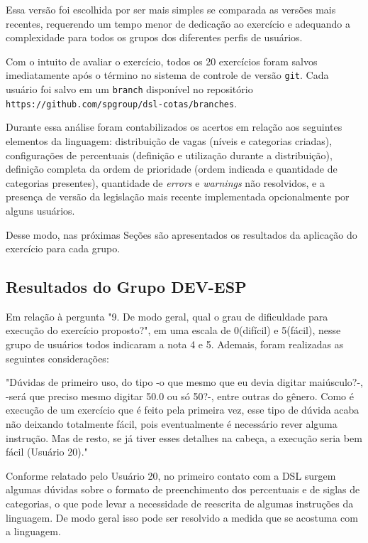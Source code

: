 Essa versão foi escolhida por ser mais simples se comparada as versões mais recentes, requerendo um tempo menor de dedicação ao exercício e adequando a complexidade para todos os grupos dos diferentes perfis de usuários. 


Com o intuito de avaliar o exercício, todos os 20 exercícios foram salvos imediatamente após o término no sistema de controle de versão \texttt{git}. Cada usuário foi salvo em um \texttt{branch} disponível no repositório \texttt{https://github.com/spgroup/dsl-cotas/branches}.


Durante essa análise foram contabilizados os acertos em relação aos seguintes elementos da linguagem: distribuição de vagas (níveis e categorias criadas), configurações de percentuais (definição e utilização durante a distribuição), definição completa da ordem de prioridade (ordem indicada e quantidade de categorias presentes), quantidade de \textit{errors} e \textit{warnings} não resolvidos, e a presença de versão da legislação mais recente implementada opcionalmente por alguns usuários.

Desse modo, nas próximas Seções são apresentados os resultados da aplicação do exercício para cada grupo.

\newpage
\subsection{Resultados do Grupo DEV-ESP}
\label{subsec:devesp}

Em relação à pergunta "9. De modo geral, qual o grau de dificuldade para execução do exercício proposto?", em uma escala de 0(difícil) e 5(fácil), nesse grupo de usuários todos indicaram a nota 4 e 5. Ademais, foram realizadas as seguintes considerações:

 \begin{citacao}
 "Dúvidas de primeiro uso, do tipo -o que  mesmo que eu devia digitar maiúsculo?-, -será que preciso mesmo digitar 50.0 ou só 50?-,  entre outras do gênero. Como é execução de um exercício que é feito pela primeira vez, esse tipo de dúvida acaba não deixando totalmente fácil, pois eventualmente é necessário rever alguma instrução. Mas de resto, se já tiver esses detalhes na cabeça, a execução seria bem fácil (Usuário 20)."
\end{citacao}

Conforme relatado pelo Usuário 20, no primeiro contato com a DSL surgem algumas dúvidas sobre o formato de preenchimento dos percentuais e de siglas de categorias, o que pode levar a necessidade de reescrita de algumas instruções da linguagem. De modo geral isso pode ser resolvido a medida que se acostuma com a linguagem.

